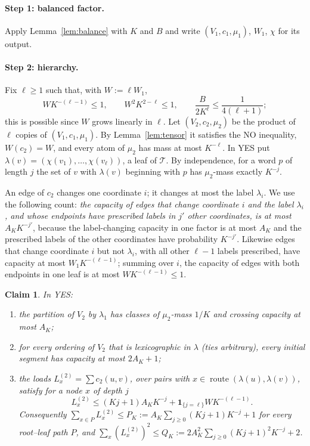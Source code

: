 \documentclass[11pt,letterpaper]{article}
\newtheorem{claim}[theorem]{Claim}
\theoremstyle{definition}
\theoremstyle{remark}
\newcommand{\ind}{\mathbf 1}
\newcommand{\Tr}{\mathcal T}
\DeclareMathOperator{\route}{route}
\begin{document}
\paragraph{Step 1: balanced factor.}
Apply Lemma~\ref{lem:balance} with \(K\) and \(B\) and write
\((V_1,c_1,\mu_1)\), \(W_1\), \(\chi\) for its output.

\paragraph{Step 2: hierarchy.}
Fix \(\ell\ge1\) such that, with \(W:=\ell W_1\),
\begin{equation}\label{eq:ell}
WK^{-(\ell-1)}\le1,\qquad W^2K^{2-\ell}\le1,\qquad
\frac{B}{2K^\ell}\le\frac1{4(\ell+1)};
\end{equation}
this is possible since \(W\) grows linearly in \(\ell\). Let
\((V_2,c_2,\mu_2)\) be the product of \(\ell\) copies of
\((V_1,c_1,\mu_1)\). By Lemma~\ref{lem:tensor} it satisfies the NO
inequality, \(W(c_2)=W\), and every atom of \(\mu_2\) has mass at most
\(K^{-\ell}\). In YES put \(\lambda(v)=(\chi(v_1),\dots,\chi(v_\ell))\), a
leaf of \(\Tr\). By independence, for a word \(p\) of length \(j\) the set of
\(v\) with \(\lambda(v)\) beginning with \(p\) has \(\mu_2\)-mass exactly
\(K^{-j}\).

An edge of \(c_2\) changes one coordinate \(i\); it changes at most the
label \(\lambda_i\). We use the following count: \emph{the capacity of edges
that change coordinate \(i\) and the label \(\lambda_i\), and whose
endpoints have prescribed labels in \(j'\) other coordinates, is at most
\(A_KK^{-j'}\)}, because the label-changing capacity in one factor is at most
\(A_K\) and the prescribed labels of the other coordinates have probability
\(K^{-j'}\). Likewise edges that change coordinate \(i\) but not
\(\lambda_i\), with all other \(\ell-1\) labels prescribed, have capacity
at most \(W_1K^{-(\ell-1)}\); summing over \(i\), the capacity of edges with
both endpoints in one leaf is at most \(WK^{-(\ell-1)}\le1\).

\begin{claim}\label{cl:weighted}
In YES:
\begin{enumerate}[label=\textup{(\alph*)}]
\item the partition of \(V_2\) by \(\lambda_1\) has classes of
\(\mu_2\)-mass \(1/K\) and crossing capacity at most \(A_K\);
\item for every ordering of \(V_2\) that is lexicographic in \(\lambda\)
(ties arbitrary), every initial segment has capacity at most \(2A_K+1\);
\item the loads \(L^{(2)}_x=\sum c_2(u,v)\), over pairs with
\(x\in\route(\lambda(u),\lambda(v))\), satisfy for a node \(x\) of depth
\(j\)
\[
L^{(2)}_x\le(Kj+1)A_KK^{-j}+\ind_{\{j=\ell\}}WK^{-(\ell-1)} .
\]
Consequently \(\sum_{x\in P}L^{(2)}_x\le P_K:=A_K\sum_{j\ge0}(Kj+1)K^{-j}+1\)
for every root--leaf path \(P\), and \(\sum_x(L^{(2)}_x)^2\le
Q_K:=2A_K^2\sum_{j\ge0}(Kj+1)^2K^{-j}+2\).
\end{enumerate}
\end{claim}
\end{document}
